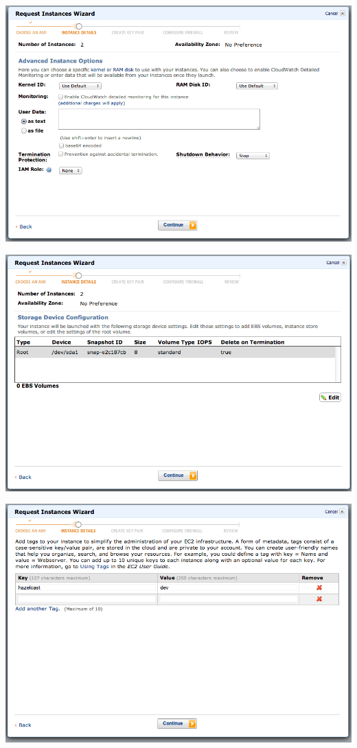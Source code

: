 \includegraphics[scale=0.40]{ec2-4.png}

\includegraphics[scale=0.40]{ec2-5.png}

\includegraphics[scale=0.40]{ec2-6.png}

